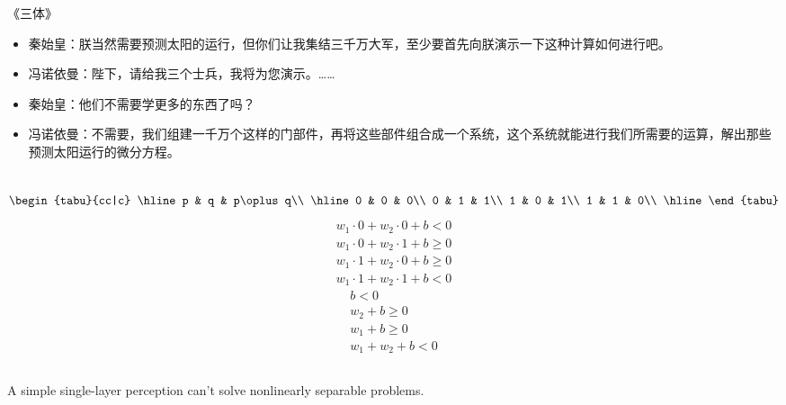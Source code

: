 \documentclass[UTF8,11pt,colorlinks,compress,openany]{beamer}%
\begin{document}
\begin{frame}\frametitle{}
\begin{block}{《三体》}
\begin{itemize}
	\item 秦始皇：朕当然需要预测太阳的运行，但你们让我集结三千万大军，至少要首先向朕演示一下这种计算如何进行吧。
	\item 冯诺依曼：陛下，请给我三个士兵，我将为您演示。……
	\item 秦始皇：他们不需要学更多的东西了吗？
	\item 冯诺依曼：不需要，我们组建一千万个这样的门部件，再将这些部件组合成一个系统，这个系统就能进行我们所需要的运算，解出那些预测太阳运行的微分方程。
\end{itemize}
\end{block}
\begin{columns}	
\[\begin{tabu}{cc|c}
	\hline
	p & q & p\oplus q\\
	\hline
	0 & 0 & 0\\
	0 & 1 & 1\\
	1 & 0 & 1\\
	1 & 1 & 0\\
	\hline
\end{tabu}\]
\begin{align*}
w_1\cdot 0+w_2\cdot 0+b<0\\
w_1\cdot 0+w_2\cdot 1+b\geq 0\\
w_1\cdot 1+w_2\cdot 0+b\geq 0\\
w_1\cdot 1+w_2\cdot 1+b<0
\end{align*}
\begin{align*}
b<0\\
w_2+b\geq 0\\
w_1+b\geq 0\\
w_1+w_2+b<0
\end{align*}
\end{columns}\vspace*{7pt}
A simple single-layer perception can't solve nonlinearly separable problems.
\end{frame}
\end{document}
